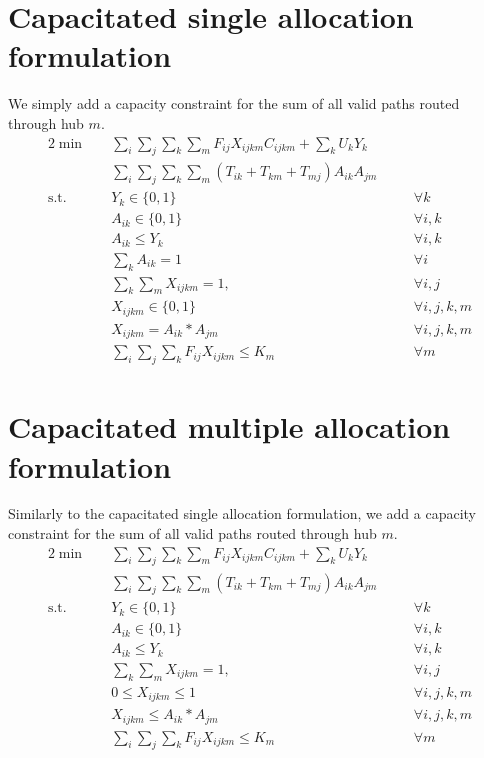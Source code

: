 \documentclass{llncs}
\begin{document}
\section{Capacitated single allocation formulation}	
	We simply add a capacity constraint for the sum of all valid paths routed through hub $m$. 
	\begin{alignat}{2}
		\min\quad
		& \sum_{i}\sum_{j}\sum_{k}\sum_{m}F_{ij}  X_{ijkm} C_{ijkm} + \sum_{k}U_k Y_{k} & & \nonumber\\
		\quad& \sum_{i}\sum_{j}\sum_{k}\sum_{m}{(T_{ik}+ T_{km}+ T_{mj} ) A_{ik} A_{jm}}  & & \tag{LP4}\label{lp4}\\
		\mbox{s.t.}  \quad
		&Y_{k} \in \{0,1\} &\quad& \forall k \label{st3.1}\\ 
		&A_{ik} \in \{0,1\} &\quad& \forall i,k \label{st3.2}\\ 
		&A_{ik} \leq Y_{k} &\quad& \forall i,k \label{st3.3}\\
		&\sum_{k}{A_{ik}} = 1 &\quad& \forall i \label{st3.4}\\
		&\sum_{k}\sum_{m}{X_{ijkm} = 1}, &\quad& \forall i,j \label{st3.5}\\
		&X_{ijkm} \in \{0,1\} &\quad& \forall i,j,k,m \label{st3.6}\\
		&X_{ijkm} = A_{ik} * A_{jm} &\quad& \forall i,j,k,m \label{st3.7} \\
		&\sum_{i}\sum_{j}\sum_{k}{F_{ij}X_{ijkm} \leq K_{m}} &\quad& \forall m \label{st3.8} 
	\end{alignat}

\section{Capacitated multiple allocation formulation}	
Similarly to the capacitated single allocation formulation, we add a capacity constraint for the sum of all valid paths routed through hub $m$.
	\begin{alignat}{2}
		\min\quad
		& \sum_{i}\sum_{j}\sum_{k}\sum_{m}F_{ij}  X_{ijkm} C_{ijkm} + \sum_{k}U_k Y_{k} & & \nonumber\\
		\quad& \sum_{i}\sum_{j}\sum_{k}\sum_{m}{(T_{ik}+ T_{km}+ T_{mj} ) A_{ik} A_{jm}}  & & \tag{LP5}\label{lp5}\\
		\mbox{s.t.}  \quad
		&Y_{k} \in \{0,1\} &\quad& \forall k \label{st4.1}\\ 
		&A_{ik} \in \{0,1\} &\quad& \forall i,k \label{st4.2}\\ 
		&A_{ik} \leq Y_{k} &\quad& \forall i,k \label{st4.3}\\
		&\sum_{k}\sum_{m}{X_{ijkm} = 1}, &\quad& \forall i,j \label{st4.4}\\
		& 0 \leq X_{ijkm} \leq 1 &\quad& \forall i,j,k,m \label{st4.5}\\
		&X_{ijkm} \leq A_{ik} * A_{jm} &\quad& \forall i,j,k,m \label{st4.6} \\
		&\sum_{i}\sum_{j}\sum_{k}{F_{ij}X_{ijkm} \leq K_{m}} &\quad& \forall m \label{st3.8}
	\end{alignat}
	
\end{document}
